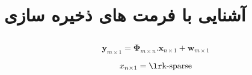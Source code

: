\section{آشنایی با فرمت های ذخیره سازی}




\subsection{}



\begin{equation}
\mathbf{y}_{m\times1} = \mathbf{\Phi}_{m\times n} . \mathbf{x}_{n\times1} + \mathbf{w}_{m\times1}
\end{equation}

\[x_{n\times1} = \lrtext{k-sparse}\]




